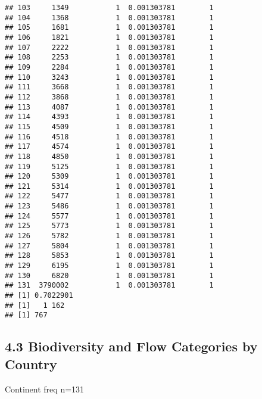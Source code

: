 \documentclass[
]{article}
\begin{document}
\begin{verbatim}
## 103     1349           1  0.001303781        1
## 104     1368           1  0.001303781        1
## 105     1681           1  0.001303781        1
## 106     1821           1  0.001303781        1
## 107     2222           1  0.001303781        1
## 108     2253           1  0.001303781        1
## 109     2284           1  0.001303781        1
## 110     3243           1  0.001303781        1
## 111     3668           1  0.001303781        1
## 112     3868           1  0.001303781        1
## 113     4087           1  0.001303781        1
## 114     4393           1  0.001303781        1
## 115     4509           1  0.001303781        1
## 116     4518           1  0.001303781        1
## 117     4574           1  0.001303781        1
## 118     4850           1  0.001303781        1
## 119     5125           1  0.001303781        1
## 120     5309           1  0.001303781        1
## 121     5314           1  0.001303781        1
## 122     5477           1  0.001303781        1
## 123     5486           1  0.001303781        1
## 124     5577           1  0.001303781        1
## 125     5773           1  0.001303781        1
## 126     5782           1  0.001303781        1
## 127     5804           1  0.001303781        1
## 128     5853           1  0.001303781        1
## 129     6195           1  0.001303781        1
## 130     6820           1  0.001303781        1
## 131  3790002           1  0.001303781        1
## [1] 0.7022901
## [1]   1 162
## [1] 767
\end{verbatim}

\hypertarget{biodiversity-and-flow-categories-by-country}{%
\subsection{4.3 Biodiversity and Flow Categories by
Country}\label{biodiversity-and-flow-categories-by-country}}

Continent freq n=131
\end{document}
